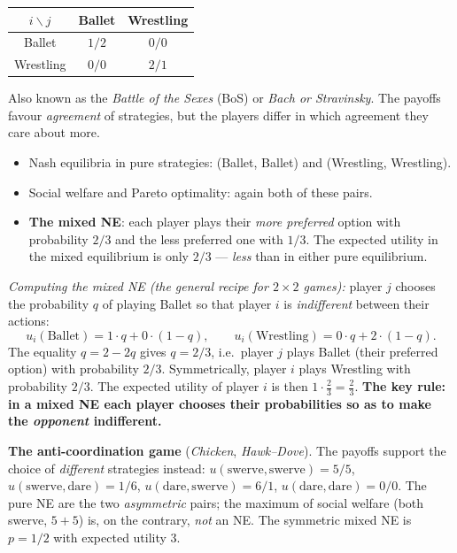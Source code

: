 \documentclass[11pt,a4paper]{article}
\theoremstyle{definition}
\begin{document}
\begin{defbox}
\begin{center}
\begin{tabular}{c|cc}
$i \backslash j$ & Ballet & Wrestling \\
\hline
Ballet & $1/2$ & $0/0$ \\
Wrestling & $0/0$ & $2/1$ \\
\end{tabular}
\end{center}
Also known as the \emph{Battle of the Sexes} (BoS) or \emph{Bach or Stravinsky}. The payoffs favour
\emph{agreement} of strategies, but the players differ in which agreement they care about more.
\begin{itemize}
\item Nash equilibria in pure strategies: (Ballet, Ballet) and (Wrestling, Wrestling).
\item Social welfare and Pareto optimality: again both of these pairs.
\item \textbf{The mixed NE}: each player plays their \emph{more preferred} option
  with probability $2/3$ and the less preferred one with $1/3$. The expected utility in the mixed
  equilibrium is only $2/3$ --- \emph{less} than in either pure equilibrium.
\end{itemize}

\emph{Computing the mixed NE (the general recipe for $2\times2$ games):} player $j$ chooses the
probability $q$ of playing Ballet so that player $i$ is \emph{indifferent} between their actions:
\[
u_i(\text{Ballet}) = 1\cdot q + 0\cdot(1-q), \qquad u_i(\text{Wrestling}) = 0\cdot q + 2\cdot(1-q).
\]
The equality $q = 2 - 2q$ gives $q = 2/3$, i.e.\ player $j$ plays Ballet (their preferred option)
with probability $2/3$. Symmetrically, player $i$ plays Wrestling with probability $2/3$.
The expected utility of player $i$ is then $1 \cdot \frac{2}{3} = \frac{2}{3}$.
\textbf{The key rule: in a mixed NE each player chooses their probabilities so as to make the
\emph{opponent} indifferent.}
\end{defbox}

\noindent\textbf{The anti-coordination game} (\emph{Chicken}, \emph{Hawk--Dove}). The payoffs
support the choice of \emph{different} strategies instead:
$u(\text{swerve},\text{swerve}) = 5/5$, $u(\text{swerve},\text{dare}) = 1/6$,
$u(\text{dare},\text{swerve}) = 6/1$, $u(\text{dare},\text{dare}) = 0/0$.
The pure NE are the two \emph{asymmetric} pairs; the maximum of social welfare (both swerve,
$5+5$) is, on the contrary, \emph{not} an NE. The symmetric mixed NE is $p = 1/2$ with expected
utility $3$.
\end{document}
